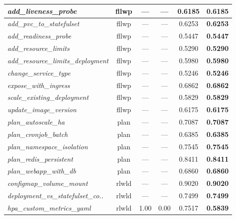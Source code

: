 \begin{footnotesize}
\begin{longtable}{|p{3.6cm}|c|c|c|c|c|}
\hline
\textit{add\_\allowbreak{}liveness\_\allowbreak{}probe} & fllwp & --- & --- & 0.6185 & \textbf{0.6185} \\
\hline
\textit{add\_\allowbreak{}pvc\_\allowbreak{}to\_\allowbreak{}statefulset} & fllwp & --- & --- & 0.6253 & \textbf{0.6253} \\
\hline
\textit{add\_\allowbreak{}readiness\_\allowbreak{}probe} & fllwp & --- & --- & 0.5447 & \textbf{0.5447} \\
\hline
\textit{add\_\allowbreak{}resource\_\allowbreak{}limits} & fllwp & --- & --- & 0.5290 & \textbf{0.5290} \\
\hline
\textit{add\_\allowbreak{}resource\_\allowbreak{}limits\_\allowbreak{}deployment} & fllwp & --- & --- & 0.5980 & \textbf{0.5980} \\
\hline
\textit{change\_\allowbreak{}service\_\allowbreak{}type} & fllwp & --- & --- & 0.5246 & \textbf{0.5246} \\
\hline
\textit{expose\_\allowbreak{}with\_\allowbreak{}ingress} & fllwp & --- & --- & 0.6862 & \textbf{0.6862} \\
\hline
\textit{scale\_\allowbreak{}existing\_\allowbreak{}deployment} & fllwp & --- & --- & 0.5829 & \textbf{0.5829} \\
\hline
\textit{update\_\allowbreak{}image\_\allowbreak{}version} & fllwp & --- & --- & 0.6175 & \textbf{0.6175} \\
\hline
\textit{plan\_\allowbreak{}autoscale\_\allowbreak{}ha} & plan & --- & --- & 0.7087 & \textbf{0.7087} \\
\hline
\textit{plan\_\allowbreak{}cronjob\_\allowbreak{}batch} & plan & --- & --- & 0.6385 & \textbf{0.6385} \\
\hline
\textit{plan\_\allowbreak{}namespace\_\allowbreak{}isolation} & plan & --- & --- & 0.7545 & \textbf{0.7545} \\
\hline
\textit{plan\_\allowbreak{}redis\_\allowbreak{}persistent} & plan & --- & --- & 0.8411 & \textbf{0.8411} \\
\hline
\textit{plan\_\allowbreak{}webapp\_\allowbreak{}with\_\allowbreak{}db} & plan & --- & --- & 0.6860 & \textbf{0.6860} \\
\hline
\textit{configmap\_\allowbreak{}volume\_\allowbreak{}mount} & rlwld & --- & --- & 0.9020 & \textbf{0.9020} \\
\hline
\textit{deployment\_\allowbreak{}vs\_\allowbreak{}statefulset\_\allowbreak{}co..} & rlwld & --- & --- & 0.7499 & \textbf{0.7499} \\
\hline
\textit{hpa\_\allowbreak{}custom\_\allowbreak{}metrics\_\allowbreak{}yaml} & rlwld & 1.00 & 0.00 & 0.7517 & \textbf{0.5839} \\

\end{longtable}
\end{footnotesize}

